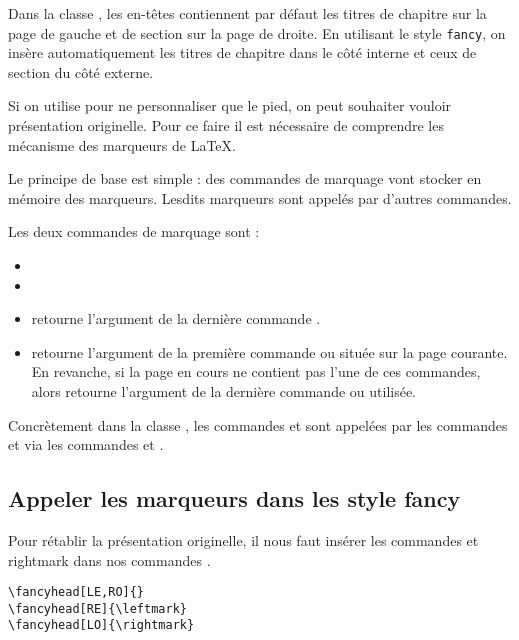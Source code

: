 Dans la classe , les en-têtes contiennent par défaut les titres de chapitre sur la page de gauche et de section sur la page de droite. En utilisant le style \verb|fancy|, on insère automatiquement les titres de chapitre dans le côté interne et ceux de section du côté externe. 

Si on utilise  pour ne personnaliser que le pied, on peut souhaiter vouloir présentation  originelle. Pour ce faire il est nécessaire de comprendre les mécanisme des marqueurs de \LaTeX. 

Le principe de base est simple : des commandes de marquage vont stocker en mémoire des marqueurs. Lesdits marqueurs sont appelés par d'autres commandes. 

Les deux commandes de marquage sont :
\begin{itemize}
\item {}
\item {}
\end{itemize}

\begin{itemize}
\item {} retourne l'argument  de la dernière commande .
\item {} retourne l'argument  de la première commande  ou   située sur la page courante. En revanche, si la page en cours ne contient pas l'une de ces commandes, alors  retourne l'argument  de la dernière commande  ou  utilisée.
\end{itemize}

Concrètement dans la classe , les commandes   et  sont appelées par les commandes  et  via les commandes  et . 

\subsection{Appeler les marqueurs dans les style fancy}

Pour rétablir la présentation originelle, il nous faut insérer les commandes  et {rightmark} dans nos commandes .

\begin{verbatim}
\fancyhead[LE,RO]{}
\fancyhead[RE]{\leftmark}
\fancyhead[LO]{\rightmark}
\end{verbatim}

